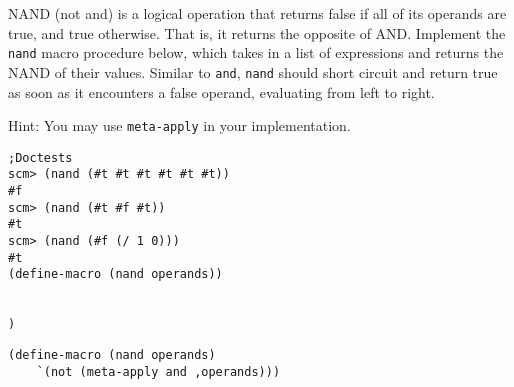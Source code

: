 \begin{blocksection}
\question NAND (not and) is a logical operation that returns false if all of its operands are true, and true otherwise. That is, it returns the opposite of AND. Implement the \lstinline{nand} macro procedure below, which takes in a list of expressions and returns the NAND of their values. Similar to \lstinline{and}, \lstinline{nand} should short circuit and return true as soon as it encounters a false operand, evaluating from left to right. 

Hint: You may use \lstinline{meta-apply} in your implementation. 

\begin{lstlisting}
;Doctests
scm> (nand (#t #t #t #t #t #t))
#f
scm> (nand (#t #f #t))
#t
scm> (nand (#f (/ 1 0)))
#t
(define-macro (nand operands))


)
\end{lstlisting}

\begin{solution}[1.5in]
\begin{lstlisting}
(define-macro (nand operands)
    `(not (meta-apply and ,operands)))
\end{lstlisting}
\end{solution}
\end{blocksection}